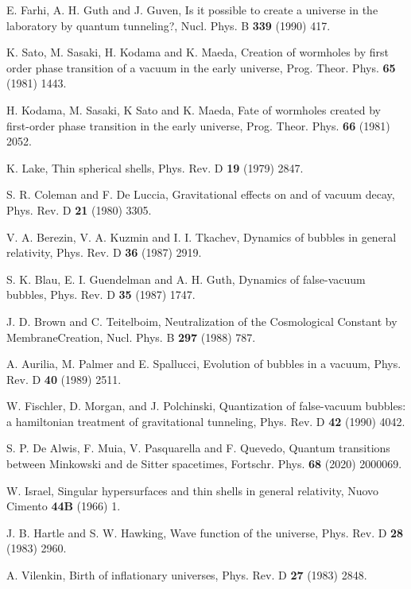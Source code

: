 \documentclass[12pt]{article}
\begin{document}
\begin{thebibliography}{99}

E. Farhi, A. H. Guth and J. Guven, Is it possible to create a universe in the laboratory by quantum tunneling?, Nucl. Phys. B {\bf339} (1990) 417.

K. Sato, M. Sasaki, H. Kodama and K. Maeda, Creation of wormholes by first order phase transition of a vacuum in the early universe, Prog. Theor. Phys. {\bf65} (1981) 1443.

H. Kodama, M. Sasaki, K Sato and K. Maeda, Fate of wormholes created by first-order phase transition in the early universe, Prog. Theor. Phys.  {\bf66} (1981) 2052.

K. Lake, Thin spherical shells, Phys. Rev. D {\bf19} (1979) 2847.

S. R. Coleman and F. De Luccia, Gravitational effects on and of vacuum decay, Phys.  Rev. D {\bf 21} (1980) 3305.

V. A. Berezin, V. A. Kuzmin and I. I. Tkachev,  Dynamics of bubbles in general relativity, Phys. Rev. D {\bf36} (1987) 2919.

S. K. Blau, E. I. Guendelman and A. H. Guth, Dynamics of false-vacuum bubbles, Phys. Rev. D {\bf35} (1987) 1747.

J. D. Brown and C. Teitelboim, Neutralization of the Cosmological Constant by MembraneCreation, Nucl. Phys. B {\bf297} (1988) 787.


A. Aurilia, M. Palmer and E. Spallucci, Evolution of bubbles in a vacuum, Phys. Rev. D {\bf40} (1989) 2511.

W. Fischler, D. Morgan, and J. Polchinski, Quantization of false-vacuum bubbles: a hamiltonian treatment of gravitational tunneling, Phys. Rev. D {\bf42} (1990) 4042.

S. P. De Alwis, F. Muia, V. Pasquarella and F. Quevedo, Quantum transitions between Minkowski and de Sitter spacetimes, Fortschr. Phys. {\bf68} (2020) 2000069.

W. Israel, Singular hypersurfaces and thin shells in general relativity, Nuovo Cimento {\bf44B} (1966) 1.

J. B. Hartle and S. W. Hawking, Wave function of the universe, Phys. Rev. D {\bf28} (1983) 2960.

A. Vilenkin, Birth of inflationary universes, Phys. Rev. D {\bf27} (1983) 2848.


\end{thebibliography}
\end{document}
